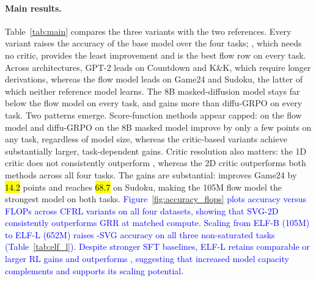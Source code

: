 \paragraph{Main results.}\label{sec:exp_main}
Table~\ref{tab:main} compares the three \method{} variants with the two references. Every variant raises the accuracy of the base model over the four tasks; \methodGRPO{}, which needs no critic, provides the least improvement and \methodSVGTwoD{} is the best flow row on every task. Across architectures, GPT-2 leads on Countdown and K\&K, which require longer derivations, whereas the flow model leads on Game24 and Sudoku, the latter of which neither reference model learns. The 8B masked-diffusion model stays far below the flow model on every task, and \methodSVGTwoD{} gains more than diffu-GRPO on every task. Two patterns emerge. Score-function methods appear capped: \methodGRPO{} on the flow model and diffu-GRPO on the 8B masked model improve by only a few points on any task, regardless of model size, whereas the critic-based variants achieve substantially larger, task-dependent gains. Critic resolution also matters: the 1D critic does not consistently outperform \methodGRPO{}, whereas the 2D critic outperforms both methods across all four tasks. The gains are substantial: \methodSVGTwoD{} improves Game24 by \hl{14.2} points and reaches \hl{68.7} on Sudoku, making the 105M flow model the strongest model on both tasks. \textcolor{blue}{Figure~\ref{fig:accuracy_flops} plots accuracy versus FLOPs across CFRL variants on all four datasets, showing that SVG-2D consistently outperforms GRR at matched compute.} \textcolor{blue}{Scaling from ELF-B (105M) to ELF-L (652M) raises \method{}-SVG accuracy on all three non-saturated tasks (Table~\ref{tab:elf_l}). Despite stronger SFT baselines, ELF-L retains comparable or larger RL gains and outperforms \methodGRPO{}, suggesting that increased model capacity complements \method{} and supports its scaling potential.}


